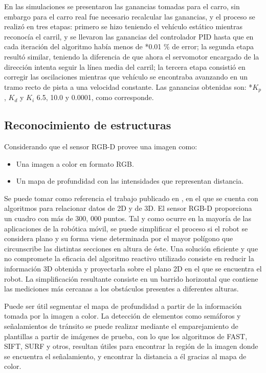 \par En las simulaciones se presentaron las ganancias tomadas para el carro, sin embargo para el carro real fue necesario recalcular las ganancias, y el proceso se realizó en tres etapas: primero se hizo teniendo el vehículo estático mientras reconocía el carril, y se llevaron las ganancias del controlador PID hasta que en cada iteración del algoritmo había menos de *0.01 \% de error; la segunda etapa resultó similar, teniendo la diferencia de que ahora el servomotor encargado de la dirección intenta seguir la línea media del carril; la tercera etapa consistió en corregir las oscilaciones mientras que vehículo se encontraba avanzando en un tramo recto de pista a una velocidad constante. Las ganancias obtenidas son: *$K_{p}$, $K_{d}$ y $K_{i}$ 6.5, 10.0 y 0.0001, como corresponde.
\subsection{Reconocimiento de estructuras}
\label{ssec:rde}
Considerando que el sensor RGB-D provee una imagen como:
\begin{itemize}
	\item Una imagen a color en formato RGB.
	\item Un mapa de profundidad con las intensidades que representan distancia.
\end{itemize}
\par Se puede  tomar como referencia el trabajo publicado en \cite{herediafavieriReconocimientoObjetosImagenes2015}, en el que se cuenta con algoritmos para relacionar datos de 2D y de 3D. El sensor RGB-D proporciona un cuadro con más de 300, 000 puntos. Tal y como ocurre en la mayoría de las aplicaciones de la robótica móvil, se puede simplificar el proceso si el robot se considera plano y su forma viene determinada por el mayor polígono que circunscribe las distintas secciones en altura de éste. Una solución eficiente y que no compromete la eficacia del algoritmo reactivo  utilizado consiste en reducir la información 3D obtenida y proyectarla sobre el plano 2D en el que se encuentra el robot. La simplificación resultante consiste en un barrido horizontal que contiene las mediciones más cercanas a los obstáculos presentes a diferentes alturas.
\par Puede ser útil segmentar el mapa de profundidad a partir de la información tomada por la imagen a color. La detección de elementos como semáforos y señalamientos de tránsito se puede realizar mediante el emparejamiento de plantillas a partir de imágenes de prueba, con lo que los algoritmos de FAST, SIFT, SURF y otros, resultan útiles para encontrar la región de la imagen donde se encuentra el señalamiento, y encontrar la distancia a él gracias al mapa de color.

